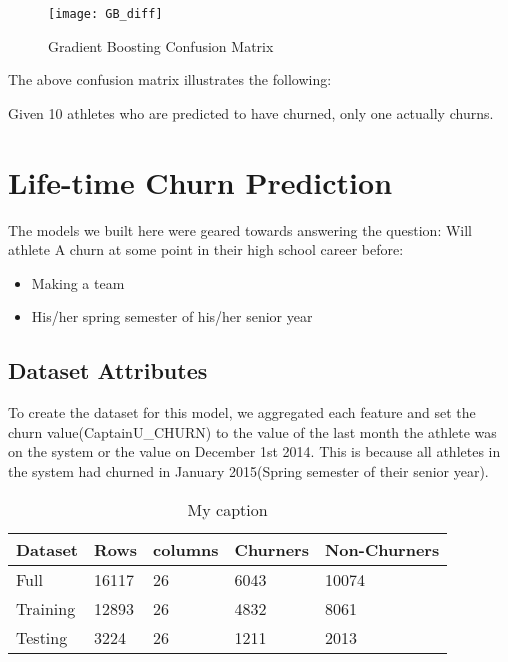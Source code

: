\documentclass[
10pt, %
a4paper, %
oneside, %
headinclude,footinclude, %
BCOR5mm, %
]{scrartcl}
\begin{document}
\begin{figure}[H]
\centering 
\texttt{[image: GB\_diff]} 
\caption[Lostic Regression Confusion Matrix]{Gradient Boosting Confusion Matrix} %
\label{fig:gallery} 
\end{figure}

The above confusion matrix illustrates the following: 

Given 10 athletes who are predicted to have churned, only one actually churns.

\section{Life-time Churn Prediction}

The models we built here were geared towards answering the question: Will athlete A churn at some point in their high school career before:

\begin{itemize}
\item Making a team
\item His/her spring semester of his/her senior year
\end{itemize}

\subsection{Dataset Attributes}
To create the dataset for this model, we aggregated each feature and set the churn value(CaptainU\_CHURN) to the value of the last month the athlete was on the system or the value on December 1st 2014. This is because all athletes in the system had churned in January 2015(Spring semester of their senior year). 

\begin{table}[H]
\centering
\caption{My caption}
\label{my-label}
\begin{tabular}{@{}lllll@{}}
\toprule
Dataset  & Rows  & columns & Churners & Non-Churners \\ \midrule
Full     & 16117 & 26      & 6043     & 10074        \\
Training & 12893 & 26      & 4832     & 8061         \\
Testing  & 3224  & 26      & 1211     & 2013         \\ \bottomrule
\end{tabular}
\end{table}
\end{document}
